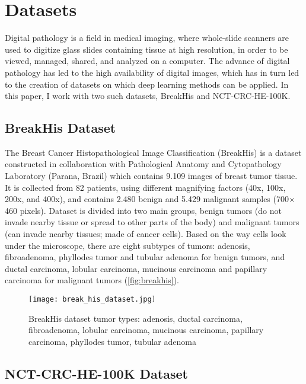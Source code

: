 \section{Datasets}
Digital pathology is a field in medical imaging, where whole-slide scanners are used to digitize glass slides containing tissue at high resolution, in order to be viewed, managed, shared, and analyzed on a computer. The advance of digital pathology has led to the high availability of digital images, which has in turn led to the creation of datasets on which deep learning methods can be applied. In this paper, I work with two such datasets, BreakHis and NCT-CRC-HE-100K.

\subsection{BreakHis Dataset}

The Breast Cancer Histopathological Image Classification \cite{breakhis_article} (BreakHis) is a dataset constructed in collaboration with Pathological Anatomy and Cytopathology Laboratory (Parana, Brazil) which contains 9.109 images of breast tumor tissue. It is collected from 82 patients, using different magnifying factors (40x, 100x, 200x, and 400x), and contains 2.480  benign and 5.429 malignant samples (700$\times$460 pixels). Dataset is divided into two main groups, benign tumors (do not invade nearby tissue or spread to other parts of the body) and malignant tumors (can invade nearby tissues; made of cancer cells). Based on the way cells look under the microscope, there are eight subtypes of tumors: adenosis, fibroadenoma, phyllodes tumor and tubular adenoma for benign tumors, and ductal carcinoma, lobular carcinoma, mucinous carcinoma and papillary carcinoma for malignant tumors (\textcolor{red}{\autoref{fig:breakhis}}).

\captionsetup[figure]{font=scriptsize,labelfont=scriptsize}

\begin{figure}[h]
	\centering
	\texttt{[image: break\_his\_dataset.jpg]}
	\caption{BreakHis dataset tumor types: adenosis, ductal carcinoma, fibroadenoma, lobular carcinoma, mucinous carcinoma, papillary carcinoma, phyllodes tumor, tubular adenoma}
	\label{fig:breakhis}
\end{figure}

\subsection{NCT-CRC-HE-100K Dataset}

